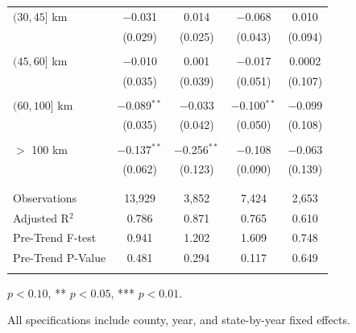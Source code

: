 \documentclass[12pt]{article}
\begin{document}
\begin{appendices}
\begin{table}[!htbp]
\begin{threeparttable}[t]
\begin{tabular}{@{\extracolsep{5pt}}lcccc}
$(30, 45]$ km                      & $-$0.031       & 0.014          & $-$0.068       & 0.010 \\
                                   & (0.029)        & (0.025)        & (0.043)        & (0.094) \\
                                   &                &                &                & \\
$(45, 60]$ km                      & $-$0.010       & 0.001          & $-$0.017       & 0.0002 \\
                                   & (0.035)        & (0.039)        & (0.051)        & (0.107) \\
                                   &                &                &                & \\
$(60, 100]$ km                     & $-$0.089$^{**}$& $-$0.033       & $-$0.100$^{**}$& $-$0.099 \\
                                   & (0.035)        & (0.042)        & (0.050)        & (0.108) \\
                                   &                &                &                & \\
$>$ 100 km                         & $-$0.137$^{**}$& $-$0.256$^{**}$& $-$0.108       & $-$0.063 \\
                                   & (0.062)        & (0.123)        & (0.090)        & (0.139) \\
                                   &                &                &                & \\
\hline \\[-1.8ex]               
Observations                       & 13,929         & 3,852          & 7,424          & 2,653 \\
Adjusted R$^{2}$                   & 0.786          & 0.871          & 0.765          & 0.610 \\
Pre-Trend F-test                   & 0.941          & 1.202          & 1.609          & 0.748 \\
Pre-Trend P-Value                  & 0.481          & 0.294          & 0.117          & 0.649 \\
\hline 
\hline \\[-1.8ex] 
\end{tabular}
\begin{tablenotes}
    \item {\footnotesize * \(p<0.10\), ** \(p<0.05\), *** \(p<0.01\).}
    \item {\footnotesize All specifications include county, year, and state-by-year fixed effects.}
  \end{tablenotes}
\end{threeparttable} 
\end{table} 



\end{appendices}
\newpage


\end{document}

